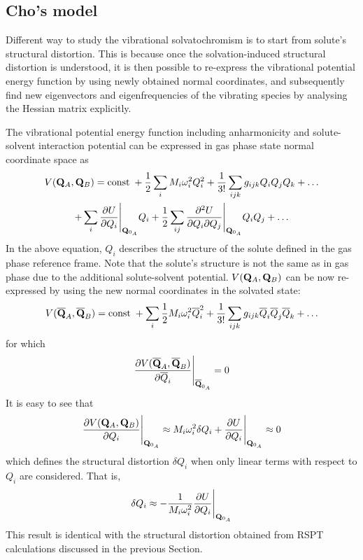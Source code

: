 \documentclass[a4paper,titlepage,twoside,fleqn,12pt]{book}
\begin{document}
\begin{refsection}
\section{Cho's model\label{s:cho-model}}

Different way to study the vibrational solvatochromism is to start from
solute's structural distortion. 
This is because once the solvation-induced structural distortion is 
understood, it is then possible to re-express the vibrational potential energy function
by using newly obtained normal coordinates, and subsequently find new eigenvectors and eigenfrequencies
of the vibrating species by analysing the Hessian matrix explicitly.

The vibrational potential energy function including anharmonicity 
and solute-solvent interaction potential
can be expressed in gas phase state normal coordinate space as
%
\begin{multline} \label{e:vib-pot-energy-function}
 V({\bf Q}_A,{\bf Q}_B) = {\rm const}\;+
\frac{1}{2} \sum_i M_i \omega_i^2 Q_i^2 + \frac{1}{3!} \sum_{ijk}  g_{ijk} Q_iQ_jQ_k + \ldots \\
+ \sum_i \frac{\partial U}{\partial Q_i} \Bigg|_{{\bf Q}_{0_A}} Q_i
+ \frac{1}{2} \sum_{ij} \frac{\partial^2 U}{\partial Q_i \partial Q_j} \Bigg|_{{\bf Q}_{0_A}} Q_iQ_j
+ \ldots
\end{multline}
%
In the above equation, $Q_i$ describes the structure of the solute
defined in the gas phase reference frame. Note that the solute's structure 
is not the same as in gas phase due to the additional solute\hyp{}solvent potential.
$V({\bf Q}_A,{\bf Q}_B)$ can be now re-expressed by using the new normal coordinates in the solvated
state:
%
\begin{equation} \label{e:vib-pot-energy-function-new}
V(\overline{{\bf Q}}_A,\overline{{\bf Q}}_B) = {\rm const}\;+
\sum_i \frac{1}{2} M_i \omega_i^2 \overline{Q}_i^2 + 
\frac{1}{3!} \sum_{ijk}  g_{ijk} \overline{Q}_i\overline{Q}_j\overline{Q}_k + \ldots
\end{equation}
%
for which 
%
\begin{equation} \label{e:vib-pot-energy-function-new.condition}
\frac{\partial V(\overline{{\bf Q}}_A,\overline{{\bf Q}}_B)}
{\partial \overline{Q}_i} \Bigg|_{{\bf \overline{Q}}_{0_A}} = 0
\end{equation}
%
It is easy to see that
%
\begin{equation} \label{e:x863}
\frac{\partial V({{\bf Q}}_A,{{\bf Q}}_B)}
{\partial Q_i} \Bigg|_{{\bf Q}_{0_A}} \approx 
M_i \omega_i^2 \delta Q_i + \frac{\partial U}{\partial Q_i} \Bigg|_{{\bf Q}_{0_A}} 
\approx 0
\end{equation}
%
which defines the structural distortion $\delta Q_i$ when only linear terms with respect to $Q_i$
are considered. That is,
%
\begin{equation} \label{e:struct-dist-cho}
\delta Q_i \approx - \frac{1}{M_i \omega_i^2} \frac{\partial U}{\partial Q_i} \Bigg|_{{\bf Q}_{0_A}} 
\end{equation}
%
This result is identical with the structural distortion
obtained from RSPT calculations discussed in the previous Section.


\end{refsection}
\end{document}
